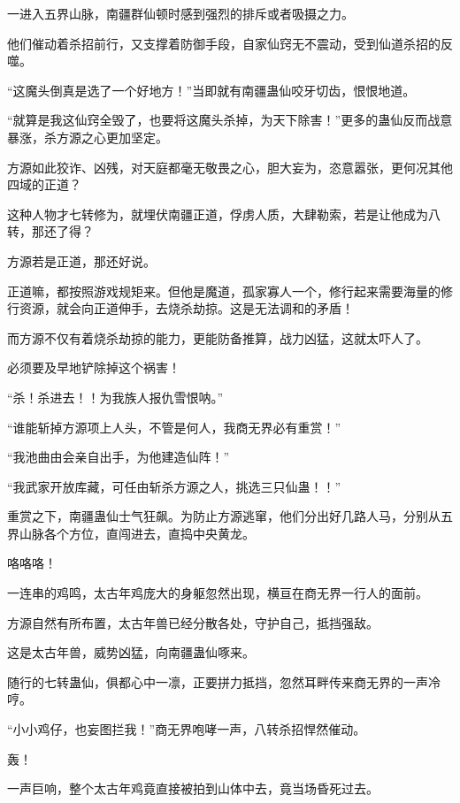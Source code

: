 
\begin{this_body}

一进入五界山脉，南疆群仙顿时感到强烈的排斥或者吸摄之力。

他们催动着杀招前行，又支撑着防御手段，自家仙窍无不震动，受到仙道杀招的反噬。

“这魔头倒真是选了一个好地方！”当即就有南疆蛊仙咬牙切齿，恨恨地道。

“就算是我这仙窍全毁了，也要将这魔头杀掉，为天下除害！”更多的蛊仙反而战意暴涨，杀方源之心更加坚定。

方源如此狡诈、凶残，对天庭都毫无敬畏之心，胆大妄为，恣意嚣张，更何况其他四域的正道？

这种人物才七转修为，就埋伏南疆正道，俘虏人质，大肆勒索，若是让他成为八转，那还了得？

方源若是正道，那还好说。

正道嘛，都按照游戏规矩来。但他是魔道，孤家寡人一个，修行起来需要海量的修行资源，就会向正道伸手，去烧杀劫掠。这是无法调和的矛盾！

而方源不仅有着烧杀劫掠的能力，更能防备推算，战力凶猛，这就太吓人了。

必须要及早地铲除掉这个祸害！

“杀！杀进去！！为我族人报仇雪恨呐。”

“谁能斩掉方源项上人头，不管是何人，我商无界必有重赏！”

“我池曲由会亲自出手，为他建造仙阵！”

“我武家开放库藏，可任由斩杀方源之人，挑选三只仙蛊！！”

重赏之下，南疆蛊仙士气狂飙。为防止方源逃窜，他们分出好几路人马，分别从五界山脉各个方位，直闯进去，直捣中央黄龙。

咯咯咯！

一连串的鸡鸣，太古年鸡庞大的身躯忽然出现，横亘在商无界一行人的面前。

方源自然有所布置，太古年兽已经分散各处，守护自己，抵挡强敌。

这是太古年兽，威势凶猛，向南疆蛊仙啄来。

随行的七转蛊仙，俱都心中一凛，正要拼力抵挡，忽然耳畔传来商无界的一声冷哼。

“小小鸡仔，也妄图拦我！”商无界咆哮一声，八转杀招悍然催动。

轰！

一声巨响，整个太古年鸡竟直接被拍到山体中去，竟当场昏死过去。


\end{this_body}
